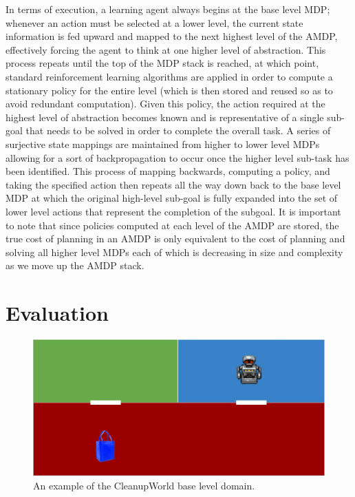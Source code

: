 \documentclass[conference]{IEEEtran}
\begin{document}
In terms of execution, a learning agent always begins at the base level MDP; whenever an action must be selected at a lower level, the current state information is fed upward and mapped to the next highest level of the AMDP, effectively forcing the agent to think at one higher level of abstraction. This process repeats until the top of the MDP stack is reached, at which point, standard reinforcement learning algorithms are applied in order to compute a stationary policy for the entire level (which is then stored and reused so as to avoid redundant computation). Given this policy, the action required at the highest level of abstraction becomes known and is representative of a single sub-goal that needs to be solved in order to complete the overall task. A series of surjective state mappings are maintained from higher to lower level MDPs allowing for a sort of backpropagation to occur once the higher level sub-task has been identified. This process of mapping backwards, computing a policy, and taking the specified action then repeats all the way down back to the base level MDP at which the original high-level sub-goal is fully expanded into the set of lower level actions that represent the completion of the subgoal. It is important to note that since policies computed at each level of the AMDP are stored, the true cost of planning in an AMDP is only equivalent to the cost of planning and solving all higher level MDPs each of which is decreasing in size and complexity as we move up the AMDP stack.

\section{Evaluation}

\begin{figure}[tbp]
\begin{center}
\includegraphics[scale=0.12]{images/cleanup}
\caption{\small An example of the CleanupWorld base level domain.
}
\end{center}
\end{figure}
\end{document}
